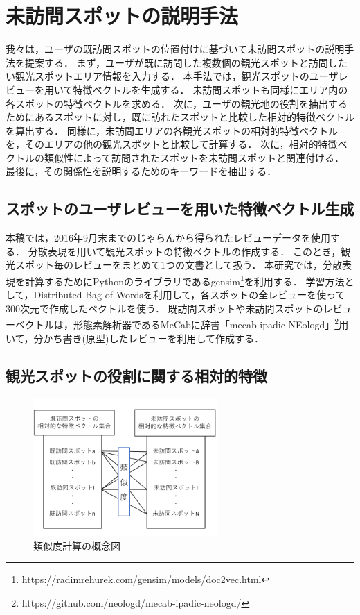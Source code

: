 \documentclass{deimj}
\begin{document}
\section{未訪問スポットの説明手法}
\label{sec:未訪問スポットの説明手法}
我々は，ユーザの既訪問スポットの位置付けに基づいて未訪問スポットの説明手法を提案する．
まず，ユーザが既に訪問した複数個の観光スポットと訪問したい観光スポットエリア情報を入力する．
本手法では，観光スポットのユーザレビューを用いて特徴ベクトルを生成する．
未訪問スポットも同様にエリア内の各スポットの特徴ベクトルを求める．
次に，ユーザの観光地の役割を抽出するためにあるスポットに対し，既に訪れたスポットと比較した相対的特徴ベクトルを算出する．
同様に，未訪問エリアの各観光スポットの相対的特徴ベクトルを，そのエリアの他の観光スポットと比較して計算する．
次に，相対的特徴ベクトルの類似性によって訪問されたスポットを未訪問スポットと関連付ける．
最後に，その関係性を説明するためのキーワードを抽出する．

\subsection{スポットのユーザレビューを用いた特徴ベクトル生成}
\label{subsec:スポットのレビューから特徴ベクトル生成}
本稿では，2016年9月末までのじゃらんから得られたレビューデータを使用する．
分散表現\cite{Codd10}を用いて観光スポットの特徴ベクトルの作成する．
このとき，観光スポット毎のレビューをまとめて1つの文書として扱う．
本研究では，分散表現を計算するためにPythonのライブラリであるgensim\footnote{https://radimrehurek.com/gensim/models/doc2vec.html}を利用する．
学習方法として，Distributed Bag-of-Wordsを利用して，各スポットの全レビューを使って300次元で作成したベクトルを使う．
既訪問スポットや未訪問スポットのレビューベクトルは，形態素解析器であるMeCab\cite{Codd11}に辞書「mecab-ipadic-NEologd」\footnote{https://github.com/neologd/mecab-ipadic-neologd/}用いて，分かち書き(原型)したレビューを利用して作成する．

\subsection{観光スポットの役割に関する相対的特徴}
\label{subsec:観光スポットの役割に関する相対的特徴}
\begin{figure}[t]
  \begin{center}
    \includegraphics[clip,width=7.0cm]{picture/Photo_CosSim_jap.png}
    \caption{類似度計算の概念図}
    \label{fig:Photo_CosSim}
  \end{center}
\end{figure}
\end{document}
